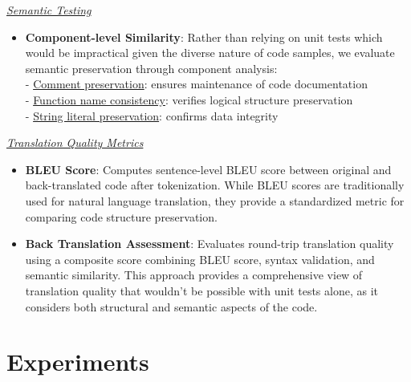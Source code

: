 \documentclass[11pt,a4paper]{article}
\begin{document}
\textit{\underline{Semantic Testing}}
\begin{itemize}[itemsep=0pt, topsep=0pt]
\item \textbf{Component-level Similarity}: Rather than relying on unit tests which would be impractical given the diverse nature of code samples, we evaluate semantic preservation through component analysis:\\ 
- \underline{Comment preservation}: ensures maintenance of code documentation\\ 
- \underline{Function name consistency}: verifies logical structure preservation\\ 
- \underline{String literal preservation}: confirms data integrity
\end{itemize}
\textit{\underline{Translation Quality Metrics}}
\begin{itemize}[itemsep=0pt, topsep=0pt]
    \item \textbf{BLEU Score}: Computes sentence-level BLEU score between original and back-translated code after tokenization. While BLEU scores are traditionally used for natural language translation, they provide a standardized metric for comparing code structure preservation.
    \item \textbf{Back Translation Assessment}: Evaluates round-trip translation quality using a composite score combining BLEU score, syntax validation, and semantic similarity. This approach provides a comprehensive view of translation quality that wouldn't be possible with unit tests alone, as it considers both structural and semantic aspects of the code.
\end{itemize}

\section{Experiments}
\end{document}
